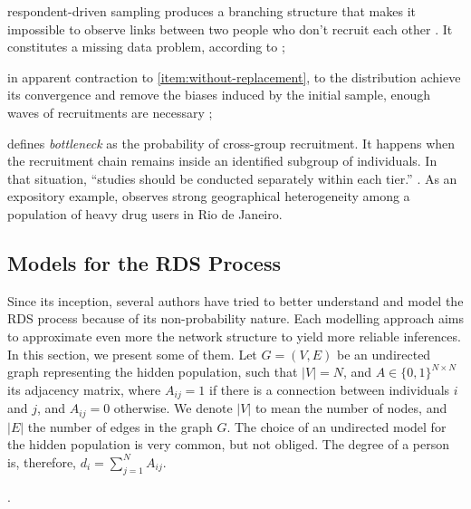 \begin{alineas}
  \item respondent-driven sampling produces a branching structure that makes
  it impossible to observe links between two people who don't recruit each
  other \cite[p. 17]{gile2015network}. It constitutes a missing data problem, according to \textcite[p.
  190]{crawford2016};

  \item in apparent contraction to \autoref{item:without-replacement}, to
  the distribution achieve its convergence and remove the biases induced by
  the initial sample, enough waves of recruitments are necessary \cite[p. 186]{heckathorn1997};
  
  \item \textcite[p. 2225]{goel2009respondent} defines {\em bottleneck}
  as the probability of cross-group recruitment. It happens when the
  recruitment chain remains inside an identified subgroup of individuals. In that
  situation, ``studies should be conducted separately within each tier.''
  \cite[p. 75]{gile2018methods}. As an expository example,
  \textcite[p. S139]{toledo2011putting} observes strong geographical
  heterogeneity among a population of heavy drug users in Rio de Janeiro. 
\end{alineas}

\subsection{Models for the RDS Process}
\label{sec:models-rds-process}

Since its inception, several authors have tried to better understand and model
the RDS process because of its non-probability nature. Each modelling approach
aims to approximate even more the network structure to yield more reliable
inferences. In this section, we present some of them. Let $G = (V,E)$ be an
undirected graph representing the hidden population, such that $|V| = N$, and
$A \in \{0,1\}^{N \times N}$ its adjacency matrix, where $A_{ij} = 1$ if there
is a connection between individuals $i$ and $j$, and $A_{ij} = 0$ otherwise.
We denote $|V|$ to mean the number of nodes, and $|E|$ the number of edges in
the graph $G$. The choice of an undirected model for the hidden population is very common,
but not obliged. The degree of a person is, therefore, $d_i = \sum_{j=1}^N
A_{ij}$. 

. 

